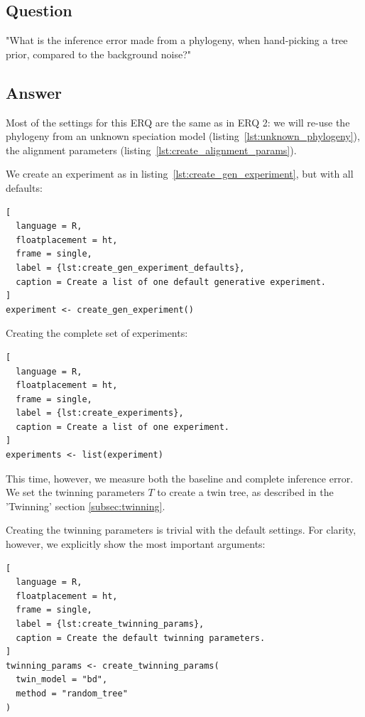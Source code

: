 \subsection{Question}

"What is the inference error made from a phylogeny, 
when hand-picking a tree prior, compared to the background noise?"

\subsection{Answer}

Most of the settings for this ERQ are
the same as in ERQ 2: we will re-use the phylogeny from an 
unknown speciation model (listing~\ref{lst:unknown_phylogeny}), 
the alignment parameters (listing~\ref{lst:create_alignment_params}).

We create an experiment as in 
listing~\ref{lst:create_gen_experiment},
but with all defaults:

\begin{lstlisting}[
  language = R,
  floatplacement = ht,
  frame = single,
  label = {lst:create_gen_experiment_defaults},
  caption = Create a list of one default generative experiment.
]
experiment <- create_gen_experiment()
\end{lstlisting}

Creating the complete set of experiments:

\begin{lstlisting}[
  language = R,
  floatplacement = ht,
  frame = single,
  label = {lst:create_experiments},
  caption = Create a list of one experiment.
]
experiments <- list(experiment)
\end{lstlisting}

This time, however, we measure both the baseline and complete inference error.
We set the twinning parameters $\mathit{T}$ to create a twin tree,
as described in the 'Twinning' section \ref{subsec:twinning}.

Creating the twinning parameters is trivial with the default settings.
For clarity, however, we explicitly show the most
important arguments:

\begin{lstlisting}[
  language = R,
  floatplacement = ht,
  frame = single,
  label = {lst:create_twinning_params},
  caption = Create the default twinning parameters.
]
twinning_params <- create_twinning_params(
  twin_model = "bd", 
  method = "random_tree"
)
\end{lstlisting}

